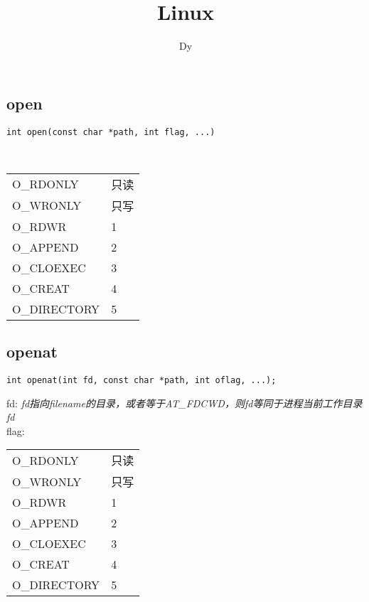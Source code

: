 \documentclass[10pt,a4paper]{article}
\begin{document}
\title{Linux}
\author{Dy}
\maketitle
\thispagestyle{empty}

\newpage
\tableofcontents
\newpage

\section{\color[rgb]{0.2,0.4,0.6}{第一章 IO流}}

\subsection{open}
\begin{spacing}{2.0}
\lstset{language=C,numbers=none}
\begin{lstlisting}
int open(const char *path, int flag, ...)
\end{lstlisting}
{\large\color[rgb]{0.2,0.4,0.6}{path:}} \\
{\large\color[rgb]{0.2,0.4,0.6}{flag:}}
\begin{table}[!htb]
	\begin{tabular}{l|l}
		O\_RDONLY & 只读 \\
		O\_WRONLY & 只写 \\
		O\_RDWR & 1 \\
		O\_APPEND & 2 \\
		O\_CLOEXEC & 3 \\
		O\_CREAT & 4 \\
		O\_DIRECTORY & 5 \\
	\end{tabular}
\end{table}
\end{spacing}

\subsection{openat}
\begin{spacing}{2.0}
\lstset{language=C,numbers=none}
\begin{lstlisting}
int openat(int fd, const char *path, int oflag, ...);
\end{lstlisting}
{\large{fd:}} {\it fd指向filename的目录，或者等于AT\_FDCWD，则fd等同于进程当前工作目录fd}  \\
{\large{flag:}}
\begin{table}[!htb]
	\begin{tabular}{l|l}
		O\_RDONLY & 只读 \\
		O\_WRONLY & 只写 \\
		O\_RDWR & 1 \\
		O\_APPEND & 2 \\
		O\_CLOEXEC & 3 \\
		O\_CREAT & 4 \\
		O\_DIRECTORY & 5 \\
	\end{tabular}
\end{table}
\end{spacing}
\end{document}
